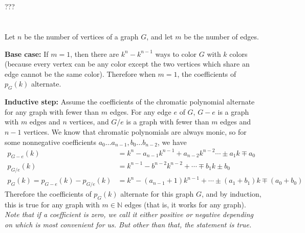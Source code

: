 \documentclass[12pt]{article}
\begin{document}
\section{}
\noindent{}\bigskip\par

\section{}
\noindent{}\bigskip\par
???

\section{}
\noindent{}\bigskip\par
Let $n$ be the number of vertices of a graph $G$, and let $m$ be the number of edges.
\par
\textbf{Base case:} If $m=1$, then there are $k^n-k^{n-1}$ ways to color $G$ with $k$ colors (because every vertex can be any color except the two vertices which share an edge cannot be the same color). Therefore when $m=1$, the coefficients of $p_G(k)$ alternate.
\par
\textbf{Inductive step:} Assume the coefficients of the chromatic polynomial alternate for any graph with fewer than $m$ edges. For any edge $e$ of $G$, $G-e$ is a graph with $m$ edges and $n$ vertices, and $G/e$ is a graph with fewer than $m$ edges and $n-1$ vertices. We know that chromatic polynomials are always monic, so for some nonnegative coefficients $a_0 \dots a_{n-1}, b_0 \dots b_{n-2}$, we have
\begin{align*}
    p_{G-e}(k) &= k^n-a_{n-1}k^{n-1}+a_{n-2}k^{n-2}\cdots \pm a_1k \mp a_0 \\
    p_{G/e}(k) &= k^{n-1}-b^{n-2}k^{n-2}+\cdots\mp b_1k \pm b_0 \\
    p_G(k)=p_{G-e}(k)-p_{G/e}(k) &= k^n-(a_{n-1}+1)k^{n-1}+\cdots \pm (a_1+b_1)k \mp (a_0+b_0)
\end{align*}
Therefore the coefficients of $p_G(k)$ alternate for this graph $G$, and by induction, this is true for any graph with $m \in \mathbb{N}$ edges (that is, it works for any graph). \textit{Note that if a coefficient is zero, we call it either positive or negative depending on which is most convenient for us. But other than that, the statement is true.}
\end{document}
